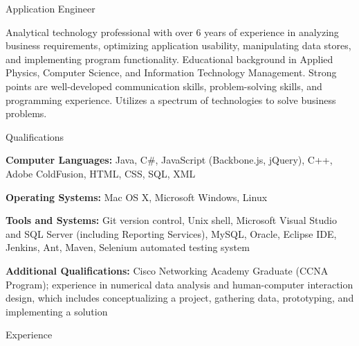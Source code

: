 



\vspace{1mm}

\begin{Large}\textsf{Application Engineer}\end{Large} \vspace{-2mm}

\begin{itemize1}
	\item Analytical technology professional with over 6 years of experience in analyzing business requirements, optimizing application usability, manipulating data stores, and implementing program functionality.  Educational background in Applied Physics, Computer Science, and Information Technology Management. Strong points are well-developed communication skills, problem-solving skills, and programming experience. Utilizes a spectrum of technologies to solve business problems.
\end{itemize1}

\begin{Large}\textsf{Qualifications}\end{Large} \vspace{-2mm}

\begin{itemize1}
	\item \textbf{Computer Languages:} Java, C\#, JavaScript (Backbone.js, jQuery), C++, Adobe ColdFusion, HTML, CSS, SQL, XML \vspace{2mm}
	\item \textbf{Operating Systems:} Mac OS X, Microsoft Windows, Linux \vspace{2mm}
	\item \textbf{Tools and Systems:} Git version control, Unix shell, Microsoft Visual Studio and SQL Server (including Reporting Services), MySQL, Oracle, Eclipse IDE, Jenkins, Ant, Maven, Selenium automated testing system \vspace{2mm}
	\item \textbf{Additional Qualifications:} Cisco Networking Academy Graduate (CCNA Program); experience in numerical data analysis and human-computer interaction design, which includes conceptualizing a project, gathering data, prototyping, and implementing a solution
\end{itemize1}

\begin{Large}\textsf{Experience}\end{Large} \vspace{-2mm}

